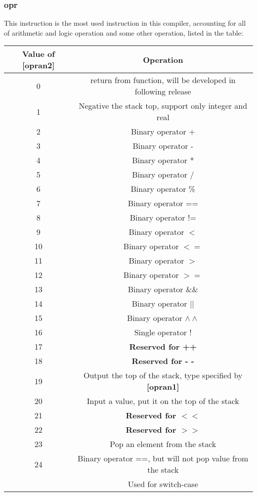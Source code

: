 \documentclass{article}
\begin{document}
		\subsubsection{opr}
		This instruction is the most used instruction in this compiler, accounting for all of arithmetic and logic operation and some other operation, listed in the table:\\
		\begin{center}
			\begin{tabular}{cc}
			\toprule
			Value of \textbf{[opran2]} & Operation \\
			\midrule
			0 & return from function, will be developed in following release\\
			1 & Negative the stack top, support only integer and real\\
			2 & Binary operator + \\
			3 & Binary operator - \\
			4 & Binary operator * \\
			5 & Binary operator / \\
			6 & Binary operator \% \\
			7 & Binary operator == \\
			8 & Binary operator != \\
			9 & Binary operator $ < $ \\
			10 & Binary operator $ <= $ \\
			11 & Binary operator $ > $ \\
			12 & Binary operator $ >= $ \\
			13 & Binary operator $ \&\& $ \\
			14 & Binary operator $ || $ \\
			15 & Binary operator $ \wedge\wedge $ \\
			16 & Single operator ! \\
			17 & \textbf{Reserved for ++}\\
			18 & \textbf{Reserved for - -}\\
			19 & Output the top of the stack, type specified by \textbf{[opran1]}\\
			20 & Input a value, put it on the top of the stack\\
			21 & \textbf{Reserved for $ << $} \\
			22 & \textbf{Reserved for $ >> $} \\
			23 & Pop an element from the stack\\
			24 & Binary operator ==, but will not pop value from the stack\\
			   & Used for switch-case\\
			\bottomrule
			\end{tabular}
			\end{center}
\end{document}
